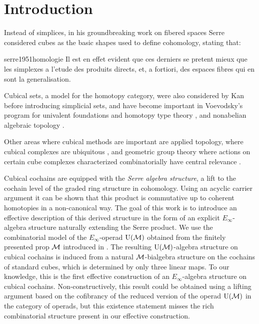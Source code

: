 
\section{Introduction} \label{s:introduction}

Instead of simplices, in his groundbreaking work on fibered spaces Serre considered cubes as the basic shapes used to define cohomology, stating that:

\begin{displaycquote}[p.431]{serre1951homologie}
	Il est en effet evident que ces derniers se pretent mieux que les simplexes a l'etude des produits directs, et, a fortiori, des espaces fibres qui en sont la generalisation.
\end{displaycquote}

Cubical sets, a model for the homotopy category, were also considered by Kan \cite{kan1955abstract, kan1956abstract} before introducing simplicial sets, and have become important in Voevodsky's program for univalent foundations and homotopy type theory \cite{kapulkin2020straightening, mortberg2017cubical}, and nonabelian algebraic topology \cite{brown2011nonabelian}.

Other areas where cubical methods are important are applied topology, where cubical complexes are ubiquitous \cite{tomasz2004computational}, and geometric group theory where actions on certain cube complexes characterized combinatorially have central relevance \cite{gromov1987hyperbolic, agol2013haken}.

Cubical cochains are equipped with the \textit{Serre algebra structure}, a lift to the cochain level of the graded ring structure in cohomology.
Using an acyclic carrier argument it can be shown that this product is commutative up to coherent homotopies in a non-canonical way.
The goal of this work is to introduce an effective description of this derived structure in the form of an explicit $E_\infty$-algebra structure naturally extending the Serre product.
We use the combinatorial model of the $E_\infty$-operad ${\operatorname{U}(\mathcal{M})}$ obtained from the finitely presented prop $\mathcal{M}$ introduced in \cite{medina2020prop1}.
The resulting ${\operatorname{U}(\mathcal{M})}$-algebra structure on cubical cochains is induced from a natural $\mathcal{M}$-bialgebra structure on the cochains of standard cubes, which is determined by only three linear maps.
To our knowledge, this is the first effective construction of an $E_\infty$-algebra structure on cubical cochains.
Non-constructively, this result could be obtained using a lifting argument based on the cofibrancy of the reduced version of the operad ${\operatorname{U}(\mathcal{M})}$ in the category of operads, but this existence statement misses the rich combinatorial structure present in our effective construction.

